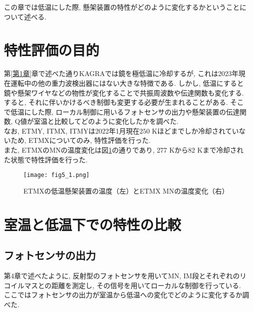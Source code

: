 この章では低温にした際, 懸架装置の特性がどのように変化するかということについて述べる. 
\section{特性評価の目的}
第\ref{第1章}章で述べた通りKAGRAでは鏡を極低温に冷却するが, これは2023年現在運転中の他の重力波検出器にはない大きな特徴である. しかし, 低温にすると鏡や懸架ワイヤなどの物性が変化することで共振周波数や伝達関数も変化する. すると, それに伴いかけるべき制御も変更する必要が生まれることがある. そこで低温にした際, ローカル制御に用いるフォトセンサの出力や懸架装置の伝達関数, Q値が室温と比較してどのように変化したかを調べた. \\
\quad なお, ETMY, ITMX, ITMYは2022年1月現在$250$ Kほどまでしか冷却されていないため, ETMXについてのみ, 特性評価を行った. \\
\quad また,  ETMXのMNの温度変化は図\ref{fig5.1}の通りであり, 277 Kから82 Kまで冷却された状態で特性評価を行った. 
\begin{figure}[H]
\begin{center}
\texttt{[image: fig5\_1.png]}
\caption[ETMXの低温懸架装置の温度]{ETMXの低温懸架装置の温度（左）とETMX MNの温度変化（右）}
\label{fig5.1}
\end{center}
\end{figure}
\section{室温と低温下での特性の比較}
\subsection{フォトセンサの出力}
第4章で述べたように, 反射型のフォトセンサを用いてMN, IM段とそれぞれのリコイルマスとの距離を測定し, その信号を用いてローカルな制御を行っている.  ここではフォトセンサの出力が室温から低温への変化でどのように変化するか調べた. 
